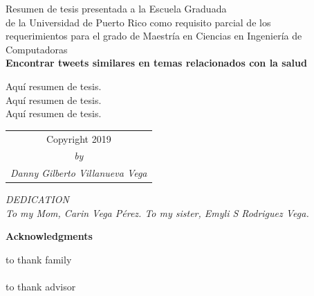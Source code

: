 \documentclass[12pt]{report}
\begin{document}
\begin{center}
Resumen de tesis presentada a la Escuela Graduada\\
de la Universidad de Puerto Rico como requisito parcial de los\\
requerimientos para el grado de Maestr\'ia en Ciencias en Ingenier\'ia de Computadoras\\

\vspace{.1cm}
\large\textbf {Encontrar tweets similares en temas relacionados con la salud}
\end{center}
\doublespacing
Aqu\'i resumen de tesis.\\
Aqu\'i resumen de tesis.\\
Aqu\'i resumen de tesis.\\
\par
\clearpage

\vspace*{\fill}
\begin{table}[H]
	\centering
	\begin{adjustbox}{max width=\textwidth }
		\begin{tabular}{c}
			Copyright \textcopyright\hspace{0.15cm}2019 \\
			\textit{by}\\
			\textit{Danny Gilberto Villanueva Vega}\\
		\end{tabular}
	\end{adjustbox} 
\end{table}
\vfill
\clearpage

\vspace*{\fill}
\begin{center}
	\textit{DEDICATION}\\
	\vspace{2cm}
	\textit{To my Mom, Carin Vega P\'erez. To my sister, Emyli S Rodriguez Vega.}
\end{center}
\vfill
\clearpage

\vspace*{\fill}

\begin{center}
	\Large \textbf{Acknowledgments}
\end{center}
to thank family\\
\\
to thank advisor\\
\end{document}
